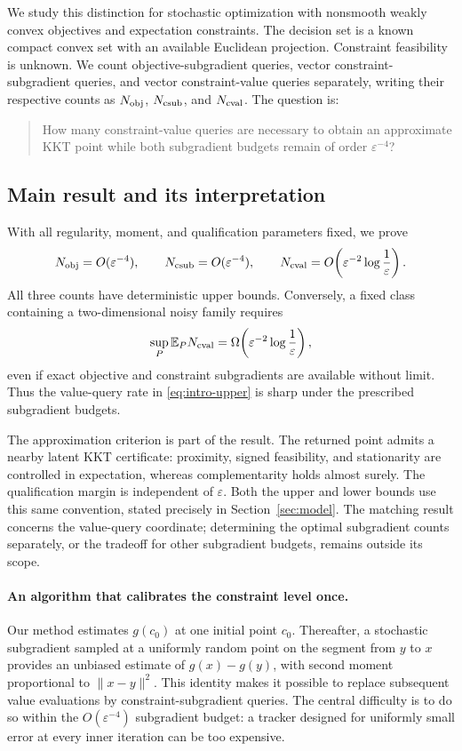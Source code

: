 \documentclass[11pt,a4paper]{article}
\newcommand{\E}{\mathbb E}
\newcommand{\eps}{\varepsilon}
\theoremstyle{remark}
\numberwithin{equation}{section}
\begin{document}
We study this distinction for stochastic optimization with nonsmooth weakly convex objectives and expectation constraints. The decision set is a known compact convex set with an available Euclidean projection. Constraint feasibility is unknown. We count objective-subgradient queries, vector constraint-subgradient queries, and vector constraint-value queries separately, writing their respective counts as $N_{\rm obj}$, $N_{\rm csub}$, and $N_{\rm cval}$. The question is:
\begin{quote}
How many constraint-value queries are necessary to obtain an approximate KKT point while both subgradient budgets remain of order $\eps^{-4}$?
\end{quote}

\subsection{Main result and its interpretation}
With all regularity, moment, and qualification parameters fixed, we prove
\begin{equation}
 N_{\rm obj}=O(\eps^{-4}),\qquad
 N_{\rm csub}=O(\eps^{-4}),\qquad
 N_{\rm cval}=O\!\left(\eps^{-2}\log\frac1\eps\right).
 \label{eq:intro-upper}
\end{equation}
All three counts have deterministic upper bounds. Conversely, a fixed class containing a two-dimensional noisy family requires
\begin{equation}
 \sup_P\E_P N_{\rm cval}
 =\Omega\!\left(\eps^{-2}\log\frac1\eps\right),
 \label{eq:intro-lower}
\end{equation}
even if exact objective and constraint subgradients are available without limit. Thus the value-query rate in \eqref{eq:intro-upper} is sharp under the prescribed subgradient budgets.

The approximation criterion is part of the result. The returned point admits a nearby latent KKT certificate: proximity, signed feasibility, and stationarity are controlled in expectation, whereas complementarity holds almost surely. The qualification margin is independent of $\eps$. Both the upper and lower bounds use this same convention, stated precisely in Section~\ref{sec:model}. The matching result concerns the value-query coordinate; determining the optimal subgradient counts separately, or the tradeoff for other subgradient budgets, remains outside its scope.

\paragraph{An algorithm that calibrates the constraint level once.}
Our method estimates $g(c_0)$ at one initial point $c_0$. Thereafter, a stochastic subgradient sampled at a uniformly random point on the segment from $y$ to $x$ provides an unbiased estimate of $g(x)-g(y)$, with second moment proportional to $\|x-y\|^2$. This identity makes it possible to replace subsequent value evaluations by constraint-subgradient queries. The central difficulty is to do so within the $O(\eps^{-4})$ subgradient budget: a tracker designed for uniformly small error at every inner iteration can be too expensive.
\end{document}
